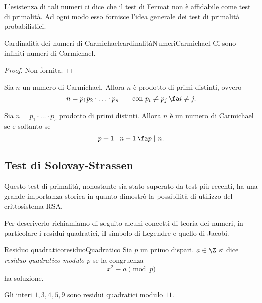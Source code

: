 	\begin{oss}
	L'esistenza di tali numeri ci dice che il test di Fermat non è affidabile come test di primalità.
	Ad ogni modo esso fornisce l'idea generale dei test di primalità probabilistici.
	\end{oss}

	\begin{teor}{Cardinalità dei numeri di Carmichael}{cardinalitàNumeriCarmichael}
	Ci sono infiniti numeri di Carmichael.
	\end{teor}

	\begin{proof}
	Non fornita.
	\end{proof}

	\begin{pr}\label{pr:Carmichael1}
	Sia \(n\) un numero di Carmichael.
	Allora \(n\) è prodotto di primi distinti, ovvero
		\[
		n = p_1 p_2 \cdot\ldots\cdot p_s \qquad\text{con }p_i \neq p_j\,\fa i\neq j.
		\]
	\end{pr}

	\begin{pr}
	Sia \(n=p_1 \cdot\ldots\cdot p_s\) prodotto di primi distinti.
	Allora \(n\) è un numero di Carmichael se e soltanto se 
		\[
		p-1 \mid n-1 \,\fa p \mid n.
		\]
	\end{pr}

\subsection{Test di Solovay-Strassen}

	Questo test di primalità, nonostante sia stato superato da test più recenti, ha una grande importanza storica in quanto dimostrò la possibilità di utilizzo del crittosistema RSA.

	Per descriverlo richiamiamo di seguito alcuni concetti di teoria dei numeri, in particolare i residui quadratici, il simbolo di Legendre e quello di Jacobi.

	\begin{defn}{Residuo quadratico}{residuoQuadratico}
	Sia \(p\) un primo dispari.
	\(a\in\Z\) si dice \emph{residuo quadratico modulo \(p\)} se la congruenza
		\[
		x^2 \equiv a \pmod{p}
		\]
	ha soluzione.
	\end{defn}

	\begin{ese}
	Gli interi \(1,3,4,5,9\) sono residui quadratici modulo \(11\).
	\end{ese}

